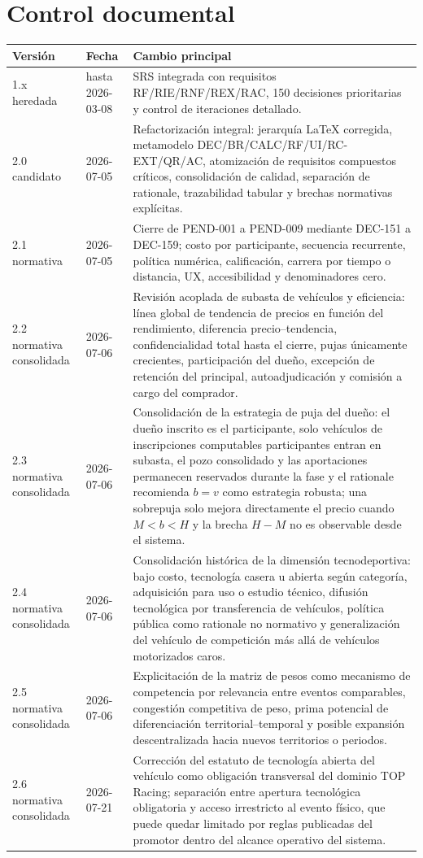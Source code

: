\documentclass[10pt,letterpaper]{article}
\begin{document}
\section{Control documental}
\begin{longtable}{P{2.0cm}P{2.6cm}P{8.8cm}}
\toprule
\textbf{Versión} & \textbf{Fecha} & \textbf{Cambio principal}\\
\midrule
1.x heredada & hasta 2026-03-08 & SRS integrada con requisitos RF/RIE/RNF/REX/RAC, 150 decisiones prioritarias y control de iteraciones detallado.\\
2.0 candidato & 2026-07-05 & Refactorización integral: jerarquía LaTeX corregida, metamodelo DEC/BR/CALC/RF/UI/RC-EXT/QR/AC, atomización de requisitos compuestos críticos, consolidación de calidad, separación de rationale, trazabilidad tabular y brechas normativas explícitas.\\
2.1 normativa & 2026-07-05 & Cierre de PEND-001 a PEND-009 mediante DEC-151 a DEC-159; costo por participante, secuencia recurrente, política numérica, calificación, carrera por tiempo o distancia, UX, accesibilidad y denominadores cero.\\
2.2 normativa consolidada & 2026-07-06 & Revisión acoplada de subasta de vehículos y eficiencia: línea global de tendencia de precios en función del rendimiento, diferencia precio--tendencia, confidencialidad total hasta el cierre, pujas únicamente crecientes, participación del dueño, excepción de retención del principal, autoadjudicación y comisión a cargo del comprador.\\
2.3 normativa consolidada & 2026-07-06 & Consolidación de la estrategia de puja del dueño: el dueño inscrito es el participante, solo vehículos de inscripciones computables participantes entran en subasta, el pozo consolidado y las aportaciones permanecen reservados durante la fase y el rationale recomienda $b=v$ como estrategia robusta; una sobrepuja solo mejora directamente el precio cuando $M<b<H$ y la brecha $H-M$ no es observable desde el sistema.\\
2.4 normativa consolidada & 2026-07-06 & Consolidación histórica de la dimensión tecnodeportiva: bajo costo, tecnología casera u abierta según categoría, adquisición para uso o estudio técnico, difusión tecnológica por transferencia de vehículos, política pública como rationale no normativo y generalización del vehículo de competición más allá de vehículos motorizados caros.\\
2.5 normativa consolidada & 2026-07-06 & Explicitación de la matriz de pesos como mecanismo de competencia por relevancia entre eventos comparables, congestión competitiva de peso, prima potencial de diferenciación territorial--temporal y posible expansión descentralizada hacia nuevos territorios o periodos.\\
2.6 normativa consolidada & 2026-07-21 & Corrección del estatuto de tecnología abierta del vehículo como obligación transversal del dominio TOP Racing; separación entre apertura tecnológica obligatoria y acceso irrestricto al evento físico, que puede quedar limitado por reglas publicadas del promotor dentro del alcance operativo del sistema.\\
\bottomrule
\end{longtable}
\end{document}
